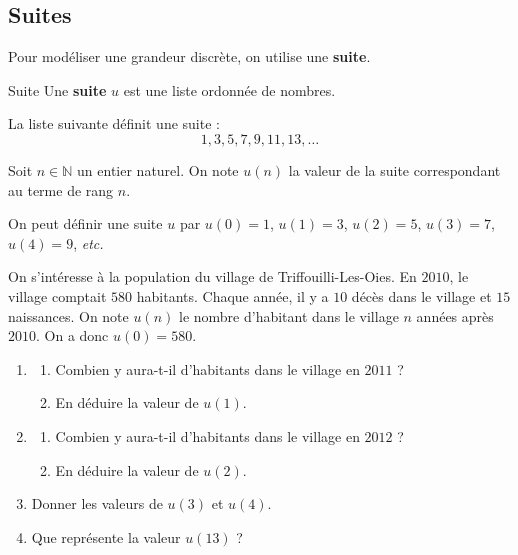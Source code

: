 \documentclass[11pt]{article}
\begin{document}
\subsection{Suites}

Pour modéliser une grandeur discrète, on utilise une \textbf{suite}.

\begin{defi}{Suite}
  Une \textbf{suite} $u$ est une liste ordonnée de nombres.
\end{defi}

\begin{exemple}
  La liste suivante définit une suite :
  \[
    1, 3, 5, 7, 9, 11, 13, \ldots
  \]
\end{exemple}

\begin{notation}
  Soit $n\in\mathbb{N}$ un entier naturel.
  On note $u(n)$ la valeur de la suite correspondant au terme de rang $n$.
\end{notation}

\begin{exemple}
  On peut définir une suite $u$ par $u(0) = 1$, $u(1) = 3$, $u(2)=5$,
  $u(3) = 7$, $u(4)=9$, \emph{etc.}
\end{exemple}

\begin{app}
  On s'intéresse à la population du village de Triffouilli-Les-Oies. En $2010$,
  le village comptait $580$ habitants. Chaque année, il y a $10$ décès dans le
  village et $15$ naissances. On note $u(n)$ le nombre d'habitant dans le
  village $n$ années après $2010$. On a donc $u(0)=580$.
  \begin{enumerate}
    \item \begin{enumerate}
        \item Combien y aura-t-il d'habitants dans le village en $2011$ ?
        \item En déduire la valeur de $u(1)$.
      \end{enumerate}
    \item \begin{enumerate}
        \item Combien y aura-t-il d'habitants dans le village en $2012$ ?
        \item En déduire la valeur de $u(2)$.
      \end{enumerate}
    \item Donner les valeurs de $u(3)$ et $u(4)$.
    \item Que représente la valeur $u(13)$ ?
  \end{enumerate}
\end{app}
\end{document}
